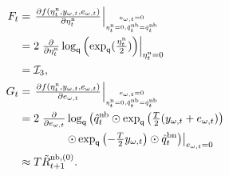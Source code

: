 \begin{subequations}
\label{eq:oriEst-filtOptFG}
\begin{align}
F_{t} &= \givenThat{\tfrac{\partial f(\oriError^\text{n}_{t},y_{\omega,t},e_{\omega,t})}{\partial \oriError^\text{n}_{t}}}{\oriError^\text{n}_{t} = 0, \tilde{q}_{t}^\text{nb} = \hat{q}_{t}^\text{nb}}{e_{\omega,t} = 0} \nonumber \\
&= 2 \left. \tfrac{\partial}{\partial \oriError^\text{n}_{t}}  \logq \left( \expq(\tfrac{\oriError^\text{n}_{t}}{2}) \right) \right|_{\oriError^\text{n}_{t} = 0} \nonumber \\
&= \mathcal{I}_3, \label{eq:oriEst-filtOptDynF} \\
G_{t} &= \givenThat{\tfrac{\partial f(\oriError^\text{n}_{t},y_{\omega,t},e_{\omega,t})}{\partial e_{\omega,t}}}{\oriError^\text{n}_{t} = 0, \tilde{q}_{t}^\text{nb} = \hat{q}_{t}^\text{nb}}{e_{\omega,t} = 0} \nonumber \\
&= 2 \left. \tfrac{\partial}{\partial e_{\omega,t}}   \logq \left( \hat{q}_{t}^\text{nb} \odot \expq \left(\tfrac{T}{2} (y_{\omega,t} + e_{\omega,t} ) \right) \right. \right. \nonumber \\
& \qquad \qquad \left. \left. \odot \expq \left(-\tfrac{T}{2} y_{\omega,t} \right) \odot \hat{q}_{t}^\text{bn} \right) \right|_{e_{\omega,t} = 0} \nonumber \\
&\approx T \tilde{R}_{t+1}^{\text{nb},(0)}.
\end{align}
\end{subequations}

